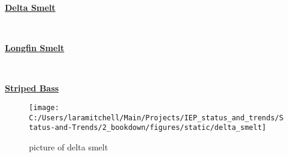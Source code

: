 \documentclass[
]{book}
\begin{document}
\begin{panel-grid}

\begin{columns-nocenter}

\begin{column800}

\textbf{\href{http://calfish.ucdavis.edu/species/?uid=47\&ds=698}{Delta Smelt}}

\end{column800}

\begin{column40}

~

\end{column40}

\begin{column800}

\textbf{\href{http://calfish.ucdavis.edu/species/?uid=87\&ds=698}{Longfin Smelt}}

\end{column800}

\begin{column40}

~

\end{column40}

\begin{column800}

\textbf{\href{http://calfish.ucdavis.edu/species/?uid=160\&ds=698}{Striped Bass}}

\end{column800}

\end{columns-nocenter}

\begin{columns-nocenter}

\begin{column800}

\begin{figure}

{\centering \texttt{[image: C:/Users/laramitchell/Main/Projects/IEP\_status\_and\_trends/Status-and-Trends/2\_bookdown/figures/static/delta\_smelt]} 

}

\caption{picture of delta smelt}\label{fig:unnamed-chunk-136}
\end{figure}

\end{column800}

\begin{column40}


\end{column40}
\end{columns-nocenter}
\end{panel-grid}
\end{document}
